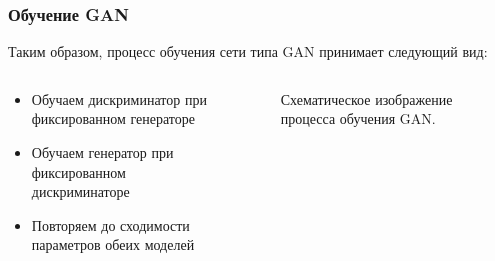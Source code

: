 \documentclass[9pt]{beamer}
\begin{document}
\begin{frame}\frametitle{Обучение GAN}
	Таким образом, процесс обучения сети типа GAN принимает следующий вид:
	\begin{columns}
			\begin{center}
				\begin{itemize}
					\item Обучаем дискриминатор при фиксированном генераторе
					\item Обучаем генератор при фиксированном дискриминаторе
					\item Повторяем до сходимости параметров обеих моделей
				\end{itemize}
			\end{center}
			\begin{figure}
				\caption{Схематическое изображение процесса обучения GAN.}
				\label{gan-train}
			\end{figure}
	\end{columns}
\end{frame}
\end{document}

